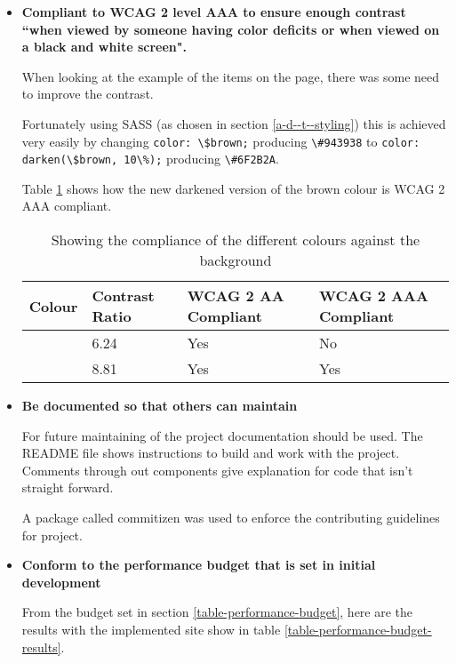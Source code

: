 \begin{itemize}
  \item \textbf{Compliant to WCAG 2 level AAA to ensure enough contrast ``when viewed by someone having color deficits or when viewed on a black and white screen". \cite{colour_contrast}}

    When looking at the example of the items on the page, there was some need to improve the contrast.

    Fortunately using SASS (as chosen in section \ref{a-d--t--styling}) this is achieved very easily by changing \verb|color: \$brown;| producing \verb|\#943938| to \verb|color: darken(\$brown, 10\%);| producing \verb|\#6F2B2A|.

    Table \ref{table-contrast-changes} shows how the new darkened version of the brown colour is WCAG 2 AAA compliant.

    \begin{table}[H]
    \centering
    \begin{tabular}{|l|l|l|l|}
    \hline
    \textbf{Colour} & \textbf{Contrast Ratio} & \textbf{WCAG 2 AA Compliant} & \textbf{WCAG 2 AAA Compliant} \\ \hline
    \cellcolor[HTML]{943938}{\color[HTML]{FFFFFF} \textbf{\#943938}} & 6.24 & Yes & No                       \\ \hline
    \cellcolor[HTML]{6F2B2A}{\color[HTML]{FFFFFF} \textbf{\#6F2B2A}} & 8.81 & Yes & Yes                      \\ \hline
    \end{tabular}
    \caption{Showing the compliance of the different colours against the background}
    \label{table-contrast-changes}
    \end{table}

  \item \textbf{Be documented so that others can maintain}

    For future maintaining of the project documentation should be used. The README file shows instructions to build and work with the project. Comments through out components give explanation for code that isn't straight forward.

    A package called commitizen was used to enforce the contributing guidelines for project. \cite{commitizen}

  \item \textbf{Conform to the performance budget that is set in initial development}

    From the budget set in section \ref{table-performance-budget}, here are the results with the implemented site show in table \ref{table-performance-budget-results}.


\end{itemize}
